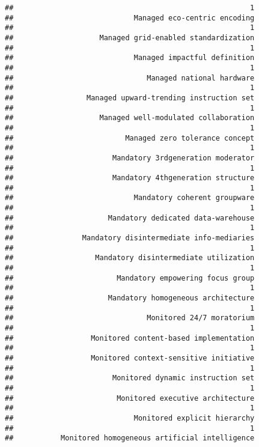 \documentclass[
]{article}
\begin{document}
\begin{verbatim}
##                                                       1 
##                            Managed eco-centric encoding 
##                                                       1 
##                    Managed grid-enabled standardization 
##                                                       1 
##                            Managed impactful definition 
##                                                       1 
##                               Managed national hardware 
##                                                       1 
##                 Managed upward-trending instruction set 
##                                                       1 
##                    Managed well-modulated collaboration 
##                                                       1 
##                          Managed zero tolerance concept 
##                                                       1 
##                       Mandatory 3rdgeneration moderator 
##                                                       1 
##                       Mandatory 4thgeneration structure 
##                                                       1 
##                            Mandatory coherent groupware 
##                                                       1 
##                      Mandatory dedicated data-warehouse 
##                                                       1 
##                Mandatory disintermediate info-mediaries 
##                                                       1 
##                   Mandatory disintermediate utilization 
##                                                       1 
##                        Mandatory empowering focus group 
##                                                       1 
##                      Mandatory homogeneous architecture 
##                                                       1 
##                               Monitored 24/7 moratorium 
##                                                       1 
##                  Monitored content-based implementation 
##                                                       1 
##                  Monitored context-sensitive initiative 
##                                                       1 
##                       Monitored dynamic instruction set 
##                                                       1 
##                        Monitored executive architecture 
##                                                       1 
##                            Monitored explicit hierarchy 
##                                                       1 
##           Monitored homogeneous artificial intelligence 

\end{verbatim}
\end{document}

